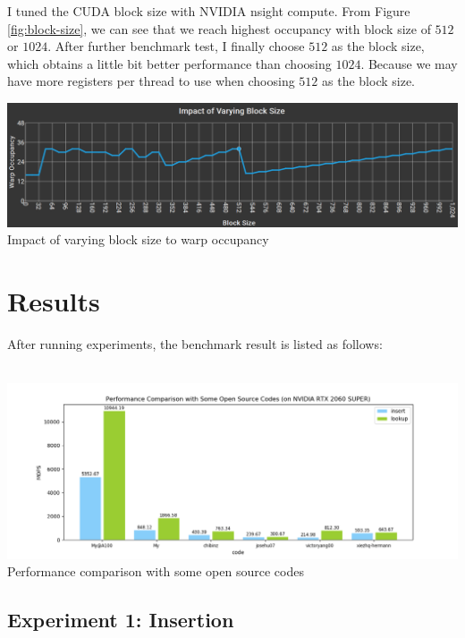 \documentclass[10pt,twocolumn,letterpaper]{article}
\begin{document}
I tuned the CUDA block size with NVIDIA nsight compute. From Figure \ref{fig:block-size}, we can see that we reach highest occupancy with block size of $512$ or $1024$. After further benchmark test, I finally choose $512$ as the block size, which obtains a little bit better performance than choosing $1024$. Because we may have more registers per thread to use when choosing $512$ as the block size.

\begin{strip}
    \centering
    \includegraphics[scale=0.7]{figures/occupancy-block-size.png}
    \label{fig:block-size}
    Impact of varying block size to warp occupancy 
\end{strip}

\section{Results}

After running experiments, the benchmark result is listed as follows:\\\\

\begin{strip}
    \centering
    \includegraphics[scale=0.5]{figures/cmp.png}
    \label{fig:cmp}
    Performance comparison with some open source codes
\end{strip}


\subsection{Experiment 1: Insertion}
\end{document}
